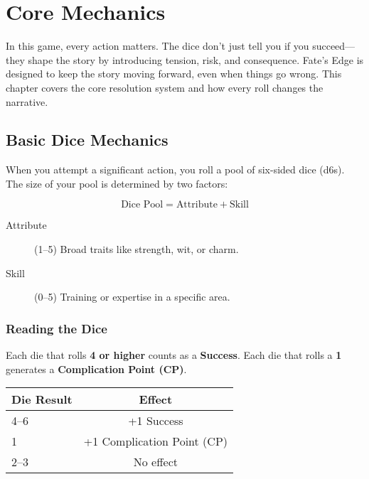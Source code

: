 
\chapter{Core Mechanics} \label{ch:core-mechanics}

\begin{multicols}{2}

In this game, every action matters. The dice don't just tell you if you succeed—they shape the story by introducing tension, risk, and consequence. Fate’s Edge is designed to keep the story moving forward, even when things go wrong. This chapter covers the core resolution system and how every roll changes the narrative.

\section{Basic Dice Mechanics} 

When you attempt a significant action, you roll a pool of six-sided dice (d6s). The size of your pool is determined by two factors:

\[
\text{Dice Pool} = \text{Attribute} + \text{Skill}
\]

\begin{description}
  \item[Attribute] (1–5) Broad traits like strength, wit, or charm. 
  \item[Skill] (0–5) Training or expertise in a specific area. 
\end{description}

\subsection*{Reading the Dice}

Each die that rolls \textbf{4 or higher} counts as a \textbf{Success}.  
Each die that rolls a \textbf{1} generates a \textbf{Complication Point (CP)}.

\begin{center}
\small
\begin{tabular}{lc}
\toprule
\textbf{Die Result} & \textbf{Effect} \\
\midrule
4--6 & +1 Success \\
1 & +1 Complication Point (CP) \\
2--3 & No effect \\
\bottomrule
\end{tabular}
\end{center}


\end{multicols}
